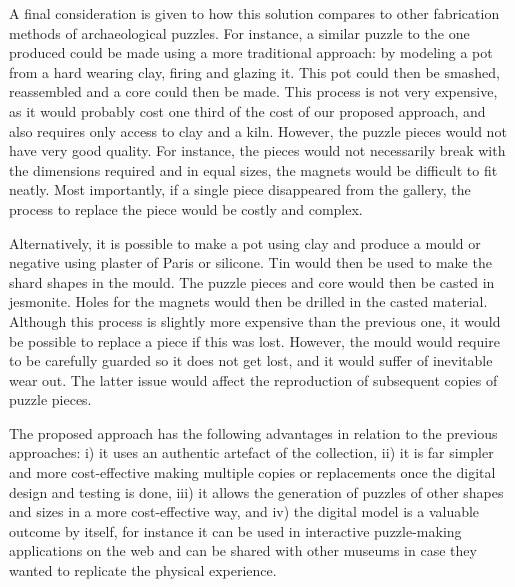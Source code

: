 \documentclass[acmlarge,screen]{acmart}
\begin{document}
A final consideration is given to how this solution compares to other fabrication methods of archaeological puzzles. For instance, a similar puzzle to the one produced could be made using a more traditional approach: by modeling a pot from a hard wearing clay, firing and glazing it. This pot could then be smashed, reassembled and a core could then be made. This process is not very expensive, as it would probably cost one third of the cost of our proposed approach, and also requires only access to clay and a kiln. However, the puzzle pieces would not have very good quality. For instance, the pieces would not necessarily break with the dimensions required and in equal sizes, the magnets would be difficult to fit neatly. Most importantly, if a single piece disappeared from the gallery, the process to replace the piece would be costly and complex. 

Alternatively, it is possible to make a pot using clay and produce a mould or negative using plaster of Paris or silicone. Tin would then be used to make the shard shapes in the mould. The puzzle pieces and core would then be casted in jesmonite. Holes for the magnets would then be drilled in the casted material. Although this process is slightly more expensive than the previous one, it would be possible to replace a piece if this was lost. However, the mould would require to be carefully guarded so it does not get lost, and it would suffer of inevitable wear out. The latter issue would affect the reproduction of subsequent copies of puzzle pieces.  

The proposed approach has the following advantages in relation to the previous approaches: i) it uses an authentic artefact of the collection, ii) it is far simpler and more cost-effective making multiple copies or replacements once the digital design and testing is done, iii) it allows the generation of puzzles of other shapes and sizes in a more cost-effective way, and iv) the digital model is a valuable outcome by itself, for instance it can be used in interactive puzzle-making applications on the web and can be shared with other museums in case they wanted to replicate the physical experience. 

\end{document}
